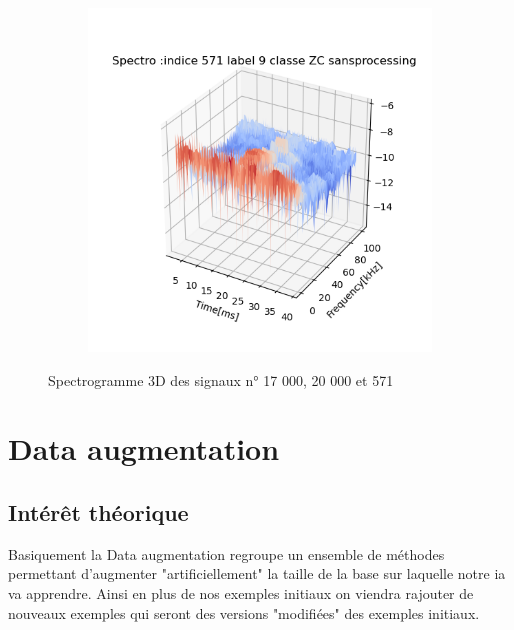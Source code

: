 \begin{figure}[!h]
\begin{subfigure}[b]{0.3\textwidth}
  \end{subfigure}
  \begin{subfigure}[b]{0.3\textwidth}
    \includegraphics[width=\textwidth]{./images/indice571Spectro3Dlabel9classeZCsansprocessingsanszoom.png}
  \end{subfigure}
  \caption{Spectrogramme 3D des signaux n° 17 000, 20 000 et 571}
\end{figure}



\hypertarget{Data-augmentation}{%
\section{Data augmentation}
\label{Data-augmentation}}

\hypertarget{}{%
\subsection{Intérêt théorique}
\label{interets_theoriques}}

Basiquement la Data augmentation regroupe un ensemble de méthodes permettant d'augmenter "artificiellement" la taille de la base sur laquelle notre ia va apprendre. Ainsi en plus de nos exemples initiaux on viendra rajouter de nouveaux exemples qui seront des versions "modifiées" des exemples initiaux.

